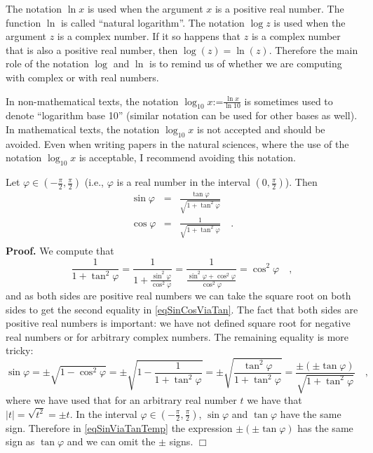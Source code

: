 \documentclass[12pt]{book}
\newcommand{\eqdef}{\textbf{:=}}
\newenvironment{proof}[1][]{ \textbf{Proof#1.} }{$\Box$\medskip}
\begin{document}
The notation $\ln x$  is used when the argument $x$ is a positive real number. The function $\ln$ is called ``natural logarithm''. The notation $\log z$ is used when the argument $z$ is a complex number. If it so happens that $z$ is a complex number that is also a positive real number, then $\log(z)=\ln(z)$. Therefore the main role of the notation $\log$ and $\ln$ is to remind us of whether we are computing with complex or with real numbers.

In non-mathematical texts, the notation $\log_{10} x\eqdef \frac{\ln x}{\ln 10}$ is sometimes used to denote ``logarithm base 10'' (similar notation can be used for other bases as well). In mathematical texts, the notation $\log_{10} x$ is not accepted and should be avoided. Even when writing papers in the natural sciences, where the use of the notation $\log_{10} x$ is acceptable, I  recommend avoiding this notation.

Let $\varphi\in (-\frac{\pi}{2} ,\frac{\pi}{2})$ (i.e., $\varphi$ is a real number in the interval $(0,\frac{\pi}{2})$). Then 
\begin{equation}\label{eqSinCosViaTan}
\begin{array}{rcl}
\sin \varphi &=& \frac{ \tan \varphi}{\sqrt  {1+\tan^2 \varphi  }}\\
\cos \varphi &=& \frac{1}{\sqrt  {1+\tan^2 \varphi  }}\quad .\\
\end{array}
\end{equation}
\begin{proof}
We compute that
\[\frac{1}{1+\tan^2 \varphi} = \frac{1}{1+\frac{\sin^2 \varphi}{\cos^2\varphi}}= \frac{1}{\frac{\sin^2\varphi+\cos^2\varphi}{\cos^2\varphi}}= \cos^2{\varphi}\quad , 
\]
and as both sides are positive real numbers we can take the square root on both sides to get the second equality in \eqref{eqSinCosViaTan}. The fact that both sides are positive real numbers is important: we have not defined square root for negative real numbers or for arbitrary complex numbers. The remaining equality is more tricky:
\begin{equation}\label{eqSinViaTanTemp}
\sin \varphi = \pm \sqrt{1-\cos^2\varphi}= \pm \sqrt{1-\frac{1}{1+\tan^2\varphi}}= \pm \sqrt{\frac{\tan^2\varphi}{1+\tan^2\varphi}}=
\frac{\pm (\pm \tan\varphi)}{\sqrt{1+\tan^2\varphi}}\quad ,
\end{equation}
where we have used that for an arbitrary real number $t$ we have that $|t|=\sqrt{t^2}=\pm t$. In the interval $\varphi\in (-\frac{\pi}{2} ,\frac{\pi}{2})$, $\sin \varphi$ and $\tan \varphi$ have the same sign. Therefore in \eqref{eqSinViaTanTemp} the expression $\pm(\pm \tan\varphi)$ has the same sign as $\tan \varphi$ and we can omit the $\pm$ signs.
\end{proof}
\end{document}
